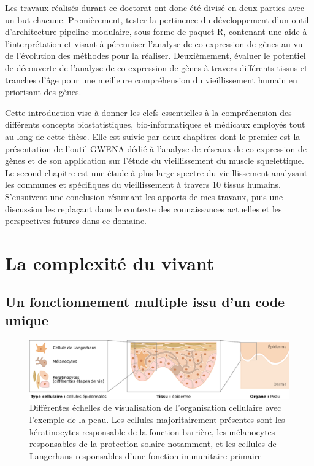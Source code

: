 Les travaux réalisés durant ce doctorat ont donc été divisé en deux parties avec un but chacune. Premièrement, tester la pertinence du développement d'un outil d'architecture pipeline modulaire, sous forme de paquet R, contenant une aide à l'interprétation et visant à pérenniser l'analyse de co-expression de gènes au vu de l'évolution des méthodes pour la réaliser. Deuxièmement, évaluer le potentiel de découverte de l'analyse de co-expression de gènes à travers différents tissus et tranches d'âge pour une meilleure compréhension du vieillissement humain en priorisant des gènes.

Cette introduction vise à donner les clefs essentielles à la compréhension des différents concepts biostatistiques, bio-informatiques et médicaux employés tout au long de cette thèse. Elle est suivie par deux chapitres dont le premier est la présentation de l'outil \acrshort{GWENA} dédié à l'analyse de réseaux de co-expression de gènes et de son application sur l'étude du vieillissement du muscle squelettique. Le second chapitre est une étude à plus large spectre du vieillissement analysant les  communes et spécifiques du vieillissement à travers 10 tissus humains. S’ensuivent une conclusion résumant les apports de mes travaux, puis une discussion les replaçant dans le contexte des connaissances actuelles et les perspectives futures dans ce domaine.




\section{La complexité du vivant}

\subsection{Un fonctionnement multiple issu d'un code unique}

\begin{figure}[b]
    \centering
    \includegraphics[width=\textwidth]{img/intro/1_context/intro_1_cell_tissue_organ.pdf}
    \caption[Différentes échelles de visualisation de l'organisation cellulaire avec l'exemple de la peau.]{Différentes échelles de visualisation de l'organisation cellulaire avec l'exemple de la peau. Les cellules majoritairement présentes sont les kératinocytes responsable de la fonction barrière, les mélanocytes responsables de la protection solaire notamment, et les cellules de Langerhans responsables d'une fonction immunitaire primaire}
    \label{fig:intro_tissu_type_cellulaire}
\end{figure}

